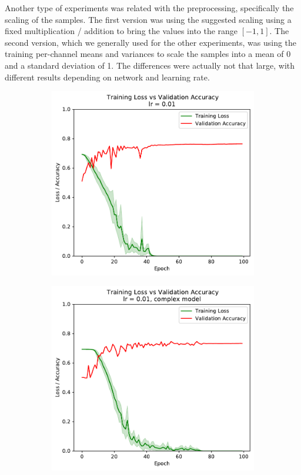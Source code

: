 \documentclass[sigconf,nonacm]{acmart}
\begin{document}
Another type of experiments was related with the
preprocessing, specifically the scaling of the
samples.
The first version was using the suggested scaling 
using a fixed multiplication / addition to bring the
values into the range $[-1,1]$.
The second version, which we generally used for the
other experiments, was using the training
per-channel means and variances to scale the samples
into a mean of 0 and a standard deviation of 1.
The differences were actually not that large,
with different results depending on network and
learning rate.

\begin{figure}[ht]
\begin{subfigure}[c]{0.45\columnwidth}
\includegraphics[width=\textwidth]{plot_0_01.pdf}
\end{subfigure}
\begin{subfigure}[c]{0.45\columnwidth}
\includegraphics[width=\textwidth]{plot_complex_0_01.pdf}

\end{subfigure}
\end{figure}
\end{document}
